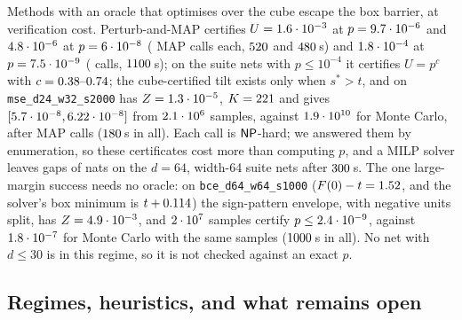 Methods with an oracle that optimises over the cube escape the box barrier, at
verification cost. Perturb-and-MAP \cite{hazan2012} certifies $U=1.6\cdot10^{-3}$ at
$p=9.7\cdot10^{-6}$ and $4.8\cdot10^{-6}$ at $p=6\cdot10^{-8}$ (\nnPmACalls{} MAP calls each, $520$ and
$480$\,s) and $1.8\cdot10^{-4}$ at $p=7.5\cdot10^{-9}$ (\nnPmCCalls{} calls, $1100$\,s); on the suite nets with $p\le10^{-4}$ it certifies $U=p^c$
with $c=0.38\text{--}0.74$; the cube-certified tilt exists only
when $s^*>t$, and on \texttt{mse\_d24\_w32\_s2000} has $Z=1.3\cdot10^{-5}$, $K=221$ and gives
$[5.7\cdot10^{-8},6.22\cdot10^{-8}]$ from $2.1\cdot10^{6}$ samples, against $1.9\cdot10^{10}$ for Monte
Carlo, after \nnCubeCalls{} MAP calls ($180$\,s in all). Each call is $\mathsf{NP}$-hard; we answered them by
enumeration, so these certificates cost more than computing $p$, and a MILP solver
leaves gaps of \nnMapGaps{} nats on the $d=64$, width-64 suite nets after
$300$\,s.
The one large-margin success needs no oracle: on \texttt{bce\_d64\_w64\_s1000}
($F(0)-t=1.52$, and the solver's box minimum is $t+0.114$)
the sign-pattern envelope, with \nnSignSplit{} negative units split, has $Z=4.9\cdot10^{-3}$,
and $2\cdot10^{7}$ samples certify $p\le2.4\cdot10^{-9}$, against $1.8\cdot10^{-7}$ for Monte
Carlo with the same samples ($1000$\,s in all). No net with $d\le30$ is in this
regime, so it is not checked against an exact $p$.

\begin{table}[tbp]
\centering\scriptsize\setlength{\tabcolsep}{3pt}
\resizebox{\textwidth}{!}{}
\caption{Barrier diagnostics (\texttt{nets\_analytic/barrier\_table.py}). $\min_{\rm
box}F-t$: value at a re-evaluated box point found by MILP ($^\dagger$: the solver's
claimed optimum, not certified); $s^*-t$: exact for $d\le28$, else the best value found
($^\ddagger$, an upper bound on $s^*-t$); floor: independent-units Chernoff value
(\cref{prop:decoupling}); $U_{\rm H\ddot older}$: best certified Hölder bound; $\log
Z_{\rm tilt}$: best box-relaxed tilt; $Z_{\rm sign}$: sign-pattern envelope (one hidden
layer); gap$_8$ and margin$_8$: median CROWN gap and margin on $8$-dimensional
subcubes; $r_{50}$: CROWN's certified subcube dimension. ``?'': $p$ unknown; ``-'': not
computed for two hidden layers.}
\label{tab:nets-barriers}
\end{table}

\subsection{Regimes, heuristics, and what remains open}\label{sec:nets-regimes}


